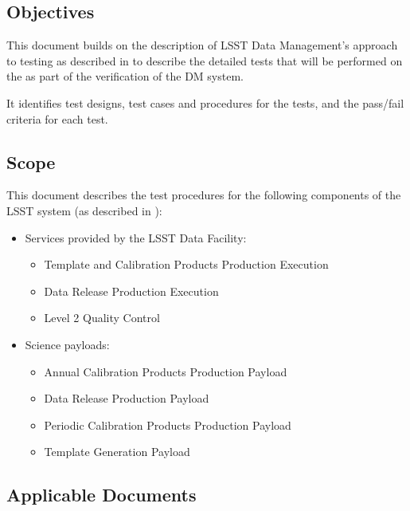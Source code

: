 \documentclass[DM,lsstdraft,STS,toc]{lsstdoc}
\begin{document}
\subsection{Objectives}
\label{sec:objectives}

This document builds on the description of LSST Data Management's approach to
testing as described in  to describe the detailed tests that
will be performed on the \product{} as part of the verification of the DM system.

It identifies test designs, test cases and procedures for the tests, and the
pass/fail criteria for each test.

\subsection{Scope}
\label{sec:scope}

This document describes the test procedures for the following components of
the LSST system (as described in ):

\begin{itemize}

  \item{Services provided by the LSST Data Facility:

    \begin{itemize}
      \item{Template and Calibration Products Production Execution}
      \item{Data Release Production Execution}
      \item{Level 2 Quality Control}
    \end{itemize}
  }

  \item{Science payloads:

    \begin{itemize}
      \item{Annual Calibration Products Production Payload}
      \item{Data Release Production Payload}
      \item{Periodic Calibration Products Production Payload}
      \item{Template Generation Payload}
    \end{itemize}

  }

\end{itemize}

\subsection{Applicable Documents}
\label{sec:docs}
\end{document}
